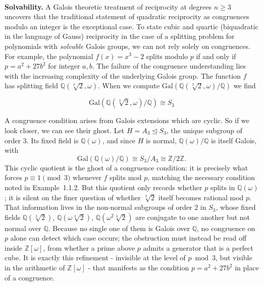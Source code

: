 \documentclass[12pt]{article}
\begin{document}
\paragraph{} \textbf{Solvability.} A Galois theoretic treatment of
reciprocity at degrees \(n\geq 3\) uncovers that the traditional statement
of quadratic reciprocity as congruences modulo an integer is the exceptional
case. To state cubic and quartic (biquadratic in the language of
Gauss) reciprocity
in the case of a splitting problem for polynomials with
\textit{solvable} Galois groups,
we can not rely solely on congruences. For example, the polynomial
\(f(x)=x^3-2\) splits modulo \(p\) if and only if \(p=a^2+27b^2\) for
integer \(a,b\). The failure of the congruence understanding lies with the
increasing complexity of the underlying Galois group. The function
\(f\) has splitting field \( \mathbb{Q}(\sqrt[3]{2}, \omega) \). When
we compute \( \mathrm{Gal}(\mathbb{Q}(\sqrt[3]{2}, \omega) /
\mathbb{Q}) \) we find

\[ \mathrm{Gal}(\mathbb{Q}(\sqrt[3]{2}, \omega) / \mathbb{Q}) \cong S_3\]

A congruence condition arises from Galois extensions which are
cyclic. So if we look closer, we
can see their ghost.
Let \(H = A_3 \trianglelefteq S_3\), the unique subgroup of order 3.
Its fixed field is \(\mathbb{Q}(\omega)\), and since \(H\) is normal,
\(\mathbb{Q}(\omega)/\mathbb{Q}\) is itself Galois, with
\[ \mathrm{Gal}(\mathbb{Q}(\omega)/\mathbb{Q}) \cong S_3/A_3 \cong
\mathbb{Z}/2\mathbb{Z}. \]
This cyclic quotient is the ghost of a congruence condition: it is
precisely what forces \(p \equiv 1 \pmod 3\) whenever \(f\) splits
mod \(p\), matching the necessary condition noted in
Example~1.1.2. But this quotient only records whether \(p\) splits in
\(\mathbb{Q}(\omega)\); it is silent on the finer question of whether
\(\sqrt[3]{2}\) itself becomes rational mod \(p\). That information
lives in the non-normal subgroups of order 2 in \(S_3\), whose fixed
fields \(\mathbb{Q}(\sqrt[3]{2})\), \(\mathbb{Q}(\omega\sqrt[3]{2})\),
\(\mathbb{Q}(\omega^2\sqrt[3]{2})\) are conjugate to one another but
not normal over \(\mathbb{Q}\). Because no single one of them is
Galois over \(\mathbb{Q}\), no congruence on \(p\) alone can detect
which case occurs; the obstruction must instead be read off inside
\(\mathbb{Z}[\omega]\), from whether a prime above \(p\) admits a
generator that is a perfect cube. It is exactly this refinement -
invisible at the level of \(p \bmod 3\), but visible in the
arithmetic of \(\mathbb{Z}[\omega]\) - that manifests as the
condition \(p = a^2+27b^2\) in place of a congruence.
\vfill
\end{document}
